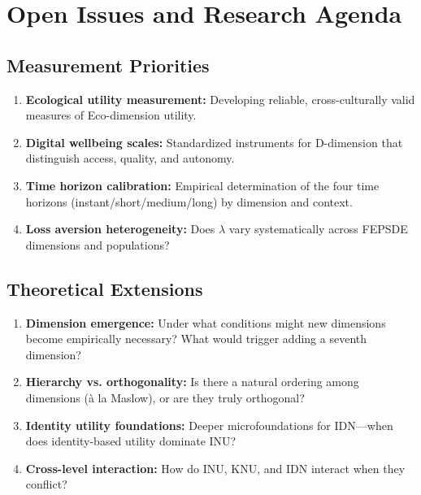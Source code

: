 \section{Open Issues and Research Agenda}
\label{sec:C-open-issues}

\subsection{Measurement Priorities}

\begin{enumerate}
    \item \textbf{Ecological utility measurement:} Developing reliable, 
    cross-culturally valid measures of Eco-dimension utility.
    
    \item \textbf{Digital wellbeing scales:} Standardized instruments for 
    D-dimension that distinguish access, quality, and autonomy.
    
    \item \textbf{Time horizon calibration:} Empirical determination of the 
    four time horizons (instant/short/medium/long) by dimension and context.
    
    \item \textbf{Loss aversion heterogeneity:} Does $\lambda$ vary 
    systematically across FEPSDE dimensions and populations?
\end{enumerate}

\subsection{Theoretical Extensions}

\begin{enumerate}
    \item \textbf{Dimension emergence:} Under what conditions might new 
    dimensions become empirically necessary? What would trigger adding a 
    seventh dimension?
    
    \item \textbf{Hierarchy vs. orthogonality:} Is there a natural ordering 
    among dimensions (à la Maslow), or are they truly orthogonal?
    
    \item \textbf{Identity utility foundations:} Deeper microfoundations for 
    IDN---when does identity-based utility dominate INU?
    
    \item \textbf{Cross-level interaction:} How do INU, KNU, and IDN interact 
    when they conflict?
\end{enumerate}

